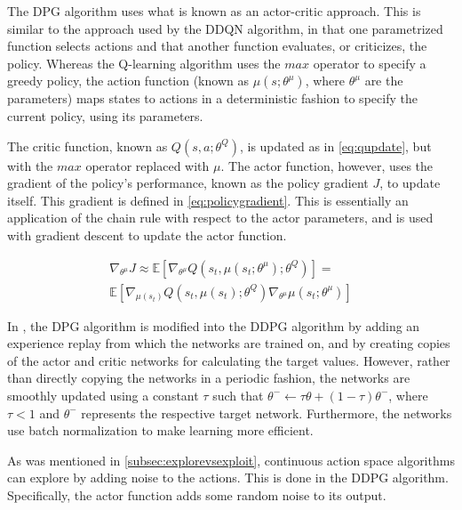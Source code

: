 \documentclass{kththesis}
\begin{document}
The DPG algorithm uses what is known as an actor-critic approach. This is similar to the approach used by the DDQN algorithm, in that one parametrized function selects actions and that another function evaluates, or criticizes, the policy. Whereas the Q-learning algorithm uses the $max$ operator to specify a greedy policy, the action function (known as $\mu(s;\theta^\mu)$, where $\theta^\mu$ are the parameters) maps states to actions in a deterministic fashion to specify the current policy, using its parameters. 

The critic function, known as $Q(s, a; \theta^Q)$, is updated as in \autoref{eq:qupdate}, but with the $max$ operator replaced with $\mu$. The actor function, however, uses the gradient of the policy's performance, known as the policy gradient $J$, to update itself. This gradient is defined in \autoref{eq:policygradient}. This is essentially an application of the chain rule with respect to the actor parameters, and is used with gradient descent to update the actor function. \parencite{lillicrap2015continuous}

\begin{equation}
\label{eq:policygradient}
\begin{split}
\nabla_{\theta^\mu}J \approx \mathbb{E}[\nabla_{\theta^\mu}Q(s_t, \mu(s_t;\theta^\mu); \theta^Q)] = \\ \mathbb{E}[\nabla_{\mu(s_t)}Q(s_t, \mu(s_t); \theta^Q)\nabla_{\theta^\mu}\mu(s_t; \theta^\mu)]
\end{split}
\end{equation}

In \textcite{lillicrap2015continuous}, the DPG algorithm is modified into the DDPG algorithm by adding an experience replay from which the networks are trained on, and by creating copies of the actor and critic networks for calculating the target values. However, rather than directly copying the networks in a periodic fashion, the networks are smoothly updated using a constant $\tau$ such that $\theta^- \leftarrow \tau\theta + (1-\tau)\theta^-$, where $\tau < 1$ and $\theta^-$ represents the respective target network. Furthermore, the networks use batch normalization to make learning more efficient. 

As was mentioned in \autoref{subsec:explorevsexploit}, continuous action space algorithms can explore by adding noise to the actions. This is done in the DDPG algorithm. Specifically, the actor function adds some random noise to its output. \parencite{lillicrap2015continuous}
\end{document}
